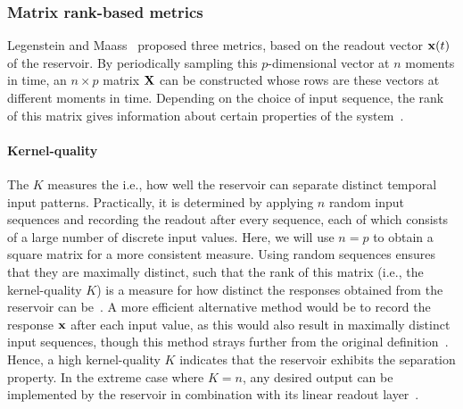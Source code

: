 \subsubsection{Matrix rank-based metrics} \label{sec:1:RC_metrics_KQ}
Legenstein and Maass~\cite{WhatMakesPowerful} proposed three metrics, based on the readout vector $\boldsymbol{\mathbf{x}}(t)$ of the reservoir.
By periodically sampling this $p$-dimensional vector at $n$ moments in time, an $n \times p$ matrix $\boldsymbol{\mathbf{X}}$ can be constructed whose rows are these vectors at different moments in time.
Depending on the choice of input sequence, the rank of this matrix gives information about certain properties of the system~\cite{RC_ASI}.

\paragraph{Kernel-quality}
The  $K$ measures the  i.e., how well the reservoir can separate distinct temporal input patterns.
Practically, it is determined by applying $n$ random input sequences and recording the readout after every sequence, each of which consists of a large number of discrete input values.
Here, we will use $n=p$ to obtain a square matrix for a more consistent measure.
Using random sequences ensures that they are maximally distinct, such that the rank of this matrix (i.e., the kernel-quality $K$) is a measure for how distinct the responses obtained from the reservoir can be~\cite{Vidamour_2022}.
A more efficient alternative method would be to record the response $\boldsymbol{\mathbf{x}}$ after each input value, as this would also result in maximally distinct input sequences, though this method strays further from the original definition~\cite{RC_HierarchicalNeuroevolution,RCbenchmarksReview1}.
Hence, a high kernel-quality $K$ indicates that the reservoir exhibits the separation property.
In the extreme case where $K=n$, any desired output can be implemented by the reservoir in combination with its linear readout layer~\cite{WhatMakesPowerful}.

